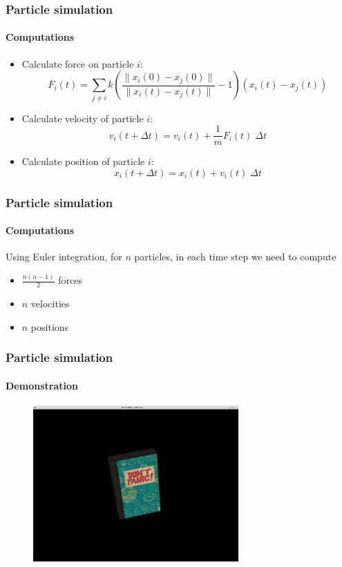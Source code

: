 \documentclass{beamer}
\begin{document}
\begin{frame}
 \frametitle{Particle simulation}
 \framesubtitle{Computations}
 \begin{itemize}
  \item Calculate force on particle $i$:
  \begin{displaymath}
   F_i(t) = \sum_{j \neq i} k \left( \frac{\|x_i(0) - x_j(0)\|}{\|x_i(t) - x_j(t)\|} - 1\right) \left(x_i(t) - x_j(t)\right)
  \end{displaymath}
  \item Calculate velocity of particle $i$:
  \begin{displaymath}
   v_i(t + \Delta t) = v_i(t) + \frac{1}{m} F_i(t) \; \Delta t
  \end{displaymath}
  \item Calculate position of particle $i$:
  \begin{displaymath}
   x_i(t + \Delta t) = x_i(t) + v_i(t) \; \Delta t
  \end{displaymath}
 \end{itemize}
\end{frame}

\begin{frame}
 \frametitle{Particle simulation}
 \framesubtitle{Computations}
 Using Euler integration, for $n$ particles, in each time step we need to compute
 \begin{itemize}
  \item $\frac{n(n-1)}{2}$ forces
  \item $n$ velocities
  \item $n$ positions
 \end{itemize}
\end{frame}

\begin{frame}
 \frametitle{Particle simulation}
 \framesubtitle{Demonstration}
 \begin{figure}
  \centering
  \includegraphics[width=0.7\textwidth]{demo.jpg}
 \end{figure}
\end{frame}
\end{document}
